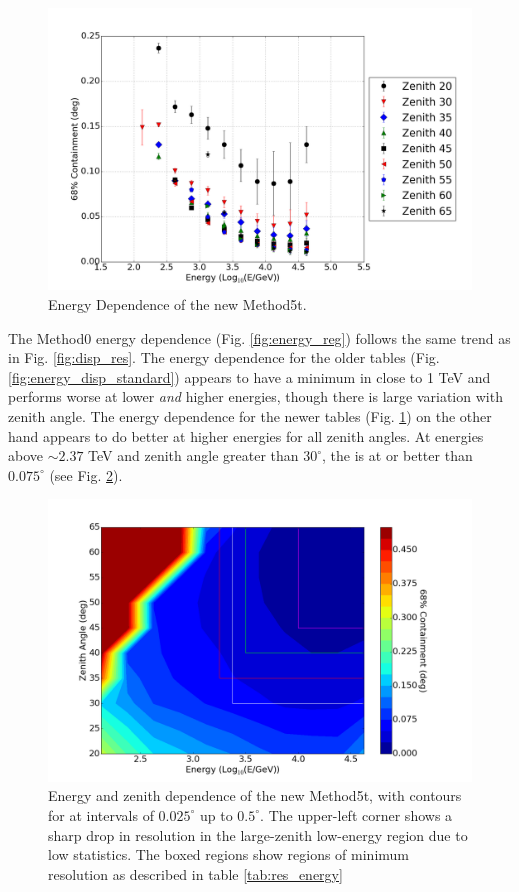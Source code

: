 \documentclass[main.tex]{subfiles}
\begin{document}
\begin{figure}[htbp]
  \centering
  \includegraphics[width=.9\linewidth]{images/disp_450_energy}
  \caption{Energy Dependence of the new Method5t.}
  \label{fig:energy_disp_450}    
\end{figure}

The Method0 energy dependence (Fig. \ref{fig:energy_reg}) follows the same trend as in Fig. \ref{fig:disp_res}. The energy dependence for the older \disp tables (Fig. \ref{fig:energy_disp_standard}) appears to have a minimum in \rse close to 1 TeV and performs worse at lower \textit{and} higher energies, though there is large variation with zenith angle. The energy dependence for the newer \disp tables (Fig. \ref{fig:energy_disp_450}) on the other hand appears to do better at higher energies for all zenith angles. At energies above $\sim 2.37$ TeV and zenith angle greater than $30^\circ$, the \rse is at or better than $0.075^\circ$ (see Fig. \ref{fig:energy_new_contour}).

\begin{figure}[htbp]
  \centering
  \includegraphics[width=.9\linewidth]{images/disp_450x4size_contour}
  \caption[Energy and zenith dependence of the new Method5t.]{Energy and zenith dependence of the new Method5t, with contours for \rse at intervals of $0.025^\circ$ up to $0.5^\circ$. The upper-left corner shows a sharp drop in resolution in the large-zenith low-energy region due to low statistics. The boxed regions show regions of minimum resolution as described in table \ref{tab:res_energy}}
  \label{fig:energy_new_contour}
\end{figure}
\end{document}
